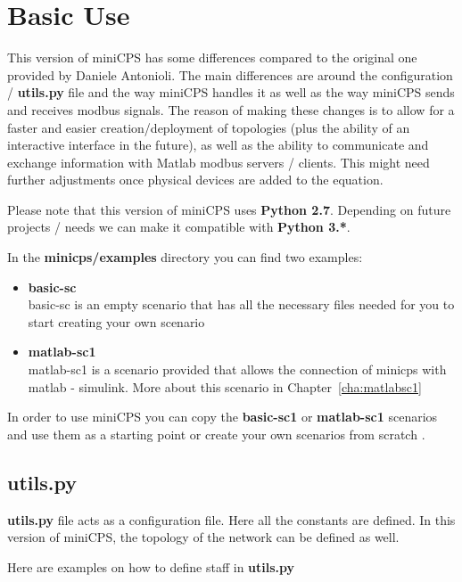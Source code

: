 \documentclass[book,a4paper,12pt]{memoir}
\begin{document}
\chapter{Basic Use}
\label{cha:basicuse}

This version of miniCPS has some differences compared to the original one provided by Daniele Antonioli.  The main differences are around the configuration / \textbf{utils.py} file and the way miniCPS handles it as well as the way miniCPS sends and receives modbus signals.  The reason of making these changes is to allow for a faster and easier creation/deployment of topologies (plus the ability of an interactive interface in the future), as well as the ability to communicate and exchange information with Matlab modbus servers / clients.  This might need further adjustments once physical devices are added to the equation.

Please note that this version of miniCPS uses \textbf{Python 2.7}.  Depending on future projects / needs we can make it compatible with \textbf{Python 3.*}.

In the \textbf{minicps/examples} directory you can find two examples:

\begin{itemize}
  \item \textbf{basic-sc} \\ basic-sc is an empty scenario that has all the necessary files needed for you to start creating your own scenario
  \item \textbf{matlab-sc1} \\ matlab-sc1 is a scenario provided that allows the connection of minicps with matlab - simulink.  More about this scenario in Chapter~\ref{cha:matlabsc1}
\end{itemize}

In order to use miniCPS you can copy the \textbf{basic-sc1} or \textbf{matlab-sc1} scenarios and use them as a starting point or create your own scenarios from scratch .

\section{utils.py}
\label{cha:basicuse-sec:utils}
\textbf{utils.py} file acts as a configuration file.  Here all the constants are defined.  In this version of miniCPS, the topology of the network can be defined as well.

\noindent Here are examples on how to define staff in \textbf{utils.py}
\end{document}
